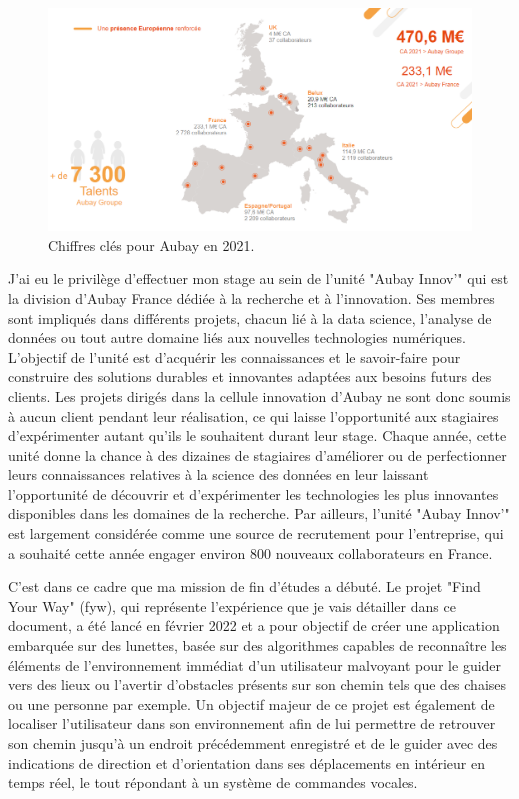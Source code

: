 \documentclass[11pt]{article}
\begin{document}
    \begin{figure}[hbt]  
      \includegraphics[width=\textwidth]{PresentationAubay1.png}    
      \caption{Chiffres clés pour Aubay en 2021.}
      \label{fig:PA1}
    \end{figure}    
    
    J'ai eu le privilège d'effectuer mon stage au sein de l'unité "Aubay Innov'" qui est la division d’Aubay France dédiée 
    à la recherche et à l'innovation. Ses membres sont impliqués dans différents projets, chacun lié à la data science, l'analyse 
    de données ou tout autre domaine liés aux nouvelles technologies numériques. L'objectif de l'unité est d'acquérir 
    les connaissances et le savoir-faire pour construire des solutions durables et innovantes adaptées aux besoins futurs des clients. 
    Les projets dirigés dans la cellule innovation d'Aubay ne sont donc soumis à aucun client pendant leur réalisation, 
    ce qui laisse l'opportunité aux stagiaires d'expérimenter autant qu'ils le souhaitent durant leur stage.
    Chaque année, cette unité donne la chance à des dizaines de stagiaires d'améliorer ou de perfectionner leurs connaissances
    relatives à la science des données en leur laissant l'opportunité de découvrir et d'expérimenter les technologies les plus 
    innovantes disponibles dans les domaines de la recherche. Par ailleurs, l'unité "Aubay Innov'" est largement considérée comme 
    une source de recrutement pour l'entreprise, qui a souhaité cette année engager environ 800 nouveaux collaborateurs en France. 
    
    C'est dans ce cadre que ma mission de fin d'études a débuté. Le projet "Find Your Way" (\acrshort{fyw}), qui représente l'expérience que je 
    vais détailler dans ce document, a été lancé en février 2022 et a pour objectif de créer une application embarquée sur des lunettes, 
    basée sur des algorithmes capables de reconnaître les éléments de l'environnement immédiat d'un utilisateur malvoyant pour le guider 
    vers des lieux ou l'avertir d'obstacles présents sur son chemin tels que des chaises ou une personne par exemple. Un objectif majeur 
    de ce projet est également de localiser l'utilisateur dans son environnement afin de lui permettre de retrouver son chemin jusqu'à
    un endroit précédemment enregistré et de le guider avec des indications de direction et d'orientation dans ses déplacements en intérieur
    en temps réel, le tout répondant à un système de commandes vocales.  
    
\end{document}

